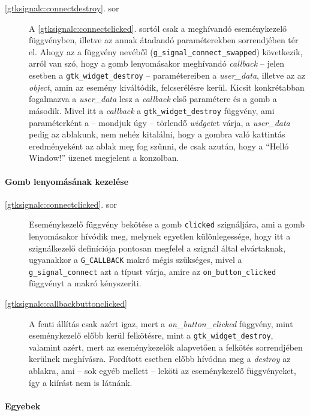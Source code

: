 \begin{description}
 \item[\ref{gtksignalc:connectdestroy}. sor] A \ref{gtksignalc:connectclicked}. sortól csak a meghívandó eseménykezelő függvényben, illetve az annak átadandó paraméterekben sorrendjében tér el. Ahogy az a függvény nevéből (\texttt{g\_signal\_connect\_swapped}) következik, arról van szó, hogy a gomb lenyomásakor meghívandó \textit{callback} -- jelen esetben a \texttt{gtk\_widget\_destroy} -- paramétereiben a \textit{user\_data}, illetve az az \textit{object}, amin az esemény kiváltódik, felcserélésre kerül. Kicsit konkrétabban fogalmazva a \textit{user\_data} lesz a \textit{callback} első paramétere és a gomb a második. Mivel itt a \textit{callback} a \texttt{gtk\_widget\_destroy} függvény, ami paraméterként a -- mondjuk úgy -- törlendő \textit{widget}et várja, a \textit{user\_data} pedig az ablakunk, nem nehéz kitalálni, hogy a gombra való kattintás eredményeként az ablak meg fog szűnni, de csak azután, hogy a ``Helló Window!'' üzenet megjelent a konzolban.
\end{description}

\paragraph{Gomb lenyomásának kezelése}

\begin{description}
 \item[\ref{gtksignalc:connectclicked}. sor] Eseménykezelő függvény bekötése a gomb \texttt{clicked} szignáljára, ami a gomb lenyomásakor hívódik meg, melynek egyetlen különlegessége, hogy itt a szignálkezelő definíciója pontosan megfelel a szignál által elvártaknak, ugyanakkor a \texttt{G\_CALLBACK} makró mégis szükséges, mivel a \texttt{g\_signal\_connect} azt a típust várja, amire az \texttt{on\_button\_clicked} függvényt a makró kényszeríti.

 \item[\ref{gtksignalc:callbackbuttonclicked}] A fenti állítás csak azért igaz, mert a \textit{on\_button\_clicked} függvény, mint eseménykezelő előbb kerül felkötésre, mint a \texttt{gtk\_widget\_destroy}, valamint azért, mert az eseménykezelők alapvetően a felkötés sorrendjében kerülnek meghívásra. Fordított esetben előbb hívódna meg a \textit{destroy} az ablakra, ami -- sok egyéb mellett -- leköti az eseménykezelő függvényeket, így a kiírást nem is látnánk.
\end{description}

\paragraph{Egyebek}

